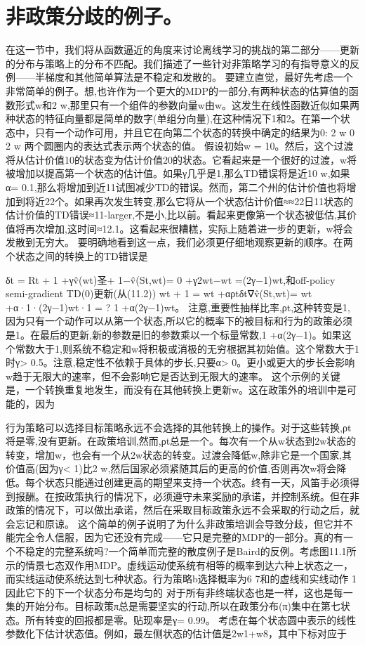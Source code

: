 \section{非政策分歧的例子。}

在这一节中，我们将从函数逼近的角度来讨论离线学习的挑战的第二部分——更新的分布与策略上的分布不匹配。我们描述了一些针对非策略学习的有指导意义的反例——半梯度和其他简单算法是不稳定和发散的。
要建立直觉，最好先考虑一个非常简单的例子。想,也许作为一个更大的MDP的一部分,有两种状态的估算值的函数形式w和2 w,那里只有一个组件的参数向量w由w。这发生在线性函数近似如果两种状态的特征向量都是简单的数字(单组分向量),在这种情况下1和2。在第一个状态中，只有一个动作可用，并且它在向第二个状态的转换中确定的结果为0:
2 w 0 2 w
两个圆圈内的表达式表示两个状态的值。
假设初始w = 10。然后，这个过渡将从估计价值10的状态变为估计价值20的状态。它看起来是一个很好的过渡，w将被增加以提高第一个状态的估计值。如果γ几乎是1,那么TD错误将是近10 w,如果α= 0.1,那么将增加到近11试图减少TD的错误。然而，第二个州的估计价值也将增加到将近22个。如果再次发生转变,那么它将从一个状态估计价值≈≈22日11状态的估计价值的TD错误≈11-larger,不是小,比以前。看起来更像第一个状态被低估,其价值将再次增加,这时间≈12.1。这看起来很糟糕，实际上随着进一步的更新，w将会发散到无穷大。
要明确地看到这一点，我们必须更仔细地观察更新的顺序。在两个状态之间的转换上的TD错误是

δt = Rt + 1 +γv̂(wt)圣+ 1−v̂(St,wt)= 0 +γ2wt−wt =(2γ−1)wt,和off-policy semi-gradient TD(0)更新(从(11.2))
wt + 1 = wt +αρtδt∇v̂(St,wt)= wt +α·1·(2γ−1)wt·1 = ? 1 +α(2γ−1)wt。
注意,重要性抽样比率,ρt,这种转变是1,因为只有一个动作可以从第一个状态,所以它的概率下的被目标和行为的政策必须是1。在最后的更新,新的参数是旧的参数乘以一个标量常数,1 +α(2γ−1)。如果这个常数大于1,则系统不稳定和w将积极或消极的无穷根据其初始值。这个常数大于1时γ> 0.5。注意,稳定性不依赖于具体的步长,只要α> 0。更小或更大的步长会影响w趋于无限大的速率，但不会影响它是否达到无限大的速率。
这个示例的关键是，一个转换重复地发生，而没有在其他转换上更新w。这在政策外的培训中是可能的，因为

行为策略可以选择目标策略永远不会选择的其他转换上的操作。对于这些转换,ρt将是零,没有更新。在政策培训,然而,ρt总是一个。每次有一个从w状态到2w状态的转变，增加w，也会有一个从2w状态的转变。过渡会降低w,除非它是一个国家,其价值高(因为γ< 1)比2 w,然后国家必须紧随其后的更高的价值,否则再次w将会降低。每个状态只能通过创建更高的期望来支持一个状态。终有一天，风笛手必须得到报酬。在按政策执行的情况下，必须遵守未来奖励的承诺，并控制系统。但在非政策的情况下，可以做出承诺，然后在采取目标政策永远不会采取的行动之后，就会忘记和原谅。
这个简单的例子说明了为什么非政策培训会导致分歧，但它并不能完全令人信服，因为它还没有完成——它只是完整的MDP的一部分。真的有一个不稳定的完整系统吗?一个简单而完整的散度例子是Baird的反例。考虑图11.1所示的情景七态双作用MDP。虚线运动使系统有相等的概率到达六种上状态之一，而实线运动使系统达到七种状态。行为策略b选择概率为6 7和的虚线和实线动作
1
因此它下的下一个状态分布是均匀的
对于所有非终端状态也是一样，这也是每一集的开始分布。目标政策π总是需要坚实的行动,所以在政策分布(π)集中在第七状态。所有转变的回报都是零。贴现率是γ= 0.99。
考虑在每个状态圆中表示的线性参数化下估计状态值。例如，最左侧状态的估计值是2w1+w8，其中下标对应于
 

